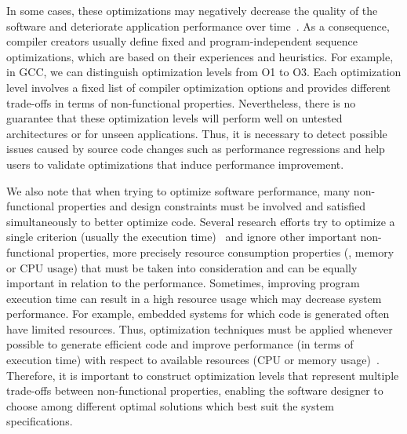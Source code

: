 In some cases, these optimizations may negatively decrease the quality of the software and deteriorate application performance over time~\cite{molyneaux2009art}. 
As a consequence, compiler creators usually define fixed and program-independent sequence optimizations, which are based on their experiences and heuristics. For example, in GCC, we can distinguish optimization levels from O1 to O3. Each optimization level involves a fixed list of compiler optimization options and provides different trade-offs in terms of non-functional properties.
Nevertheless, there is no guarantee that these optimization levels will perform well on untested architectures or for unseen applications. 
Thus, it is necessary to detect possible issues caused by source code changes such as performance regressions and help users to validate optimizations that induce performance improvement.


We also note that when trying to optimize software performance, many non-functional properties and design constraints must be involved and satisfied simultaneously to better optimize code.
Several research efforts try to optimize a single criterion (usually the execution time)~\cite{ballal2015compiler,chen2012deconstructing,demertzi2011analyzing} and ignore other important non-functional properties, more precisely resource consumption properties (\eg, memory or CPU usage) that must be taken into consideration and can be equally important in relation to the performance. Sometimes, improving program execution time can result in a high resource usage which may decrease system performance. For example, embedded systems for which code is generated often have limited resources. Thus, optimization techniques must be applied whenever possible to generate efficient code and improve performance (in terms of execution time) with respect to available resources (CPU or memory usage)~\cite{nagiub2013automatic}.
Therefore, it is important to construct optimization levels that represent multiple trade-offs between non-functional properties, enabling the software designer to choose among different optimal solutions which best suit the system specifications.



